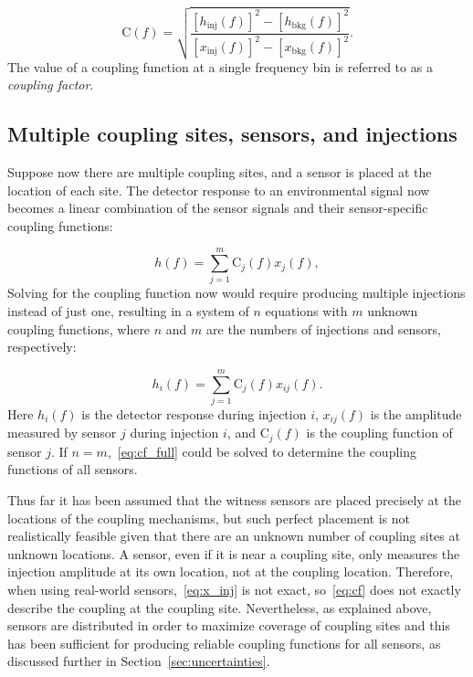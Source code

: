 \begin{equation}\label{eq:cf}
	\mathrm{C}(f) = \sqrt{\frac{[h_{\textrm{inj}}(f)]^2 - [h_{\textrm{bkg}}(f)]^2}{[x_{\textrm{inj}}(f)]^2 - [x_{\textrm{bkg}}(f)]^2}}.
\end{equation}
The value of a coupling function at a single frequency bin is referred to as a \textit{coupling factor}.

\subsection{Multiple coupling sites, sensors, and injections}

Suppose now there are multiple coupling sites, and a sensor is placed at the location of each site.
The detector response to an environmental signal now becomes a linear combination of the sensor signals and their sensor-specific coupling functions:

\begin{equation}\label{eq:cf_model_expanded}
	h(f) = \sum_{j=1}^{m} \mathrm{C}_j(f) x_{j}(f),
\end{equation}
Solving for the coupling function now would require producing multiple injections instead of just one, resulting in a system of $n$ equations with $m$ unknown coupling functions, where $n$ and $m$ are the numbers of injections and sensors, respectively:

\begin{equation}\label{eq:cf_full}
	h_i(f) = \sum_{j=1}^{m} \mathrm{C}_j(f) x_{ij}(f).
\end{equation}
Here $h_i(f)$ is the detector response during injection $i$, $x_{ij}(f)$ is the amplitude measured by sensor $j$ during injection $i$, and $\mathrm{C}_j(f)$ is the coupling function of sensor $j$.
If $n = m$,~\cref{eq:cf_full} could be solved to determine the coupling functions of all sensors.

Thus far it has been assumed that the witness sensors are placed precisely at the locations of the coupling mechanisms, but such perfect placement is not realistically feasible given that there are an unknown number of coupling sites at unknown locations.
A sensor, even if it is near a coupling site, only measures the injection amplitude at its own location, not at the coupling location.
Therefore, when using real-world sensors,~\cref{eq:x_inj} is not exact, so~\cref{eq:cf} does not exactly describe the coupling at the coupling site.
Nevertheless, as explained above, sensors are distributed in order to maximize coverage of coupling sites and this has been sufficient for producing reliable coupling functions for all sensors, as discussed further in Section~\ref{sec:uncertainties}.

